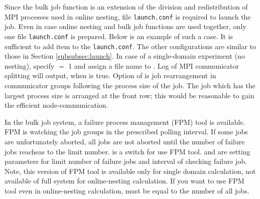 Since the bulk job function is an extension of the division and redistribution of MPI processes used in online nesting, file \verb|launch.conf| is required to launch the job. Even in case online nesting and bulk job functions are used together, only one file \verb|launch.conf| is prepared.
Below is an example of such a case.
It is sufficient to add item  to the \verb|launch.conf|. The other configurations are similar to those in Section \ref{subsubsec:launch}. In case of a single-domain experiment (no nesting), specify  $=$ 1 and assign a file name to .
Log of MPI communicator splitting will output, when  is true. Option of  is job rearrangement
in communicator groups following the process size of the job. The job which has the largest process size is arranged at the front row;
this would be reasonable to gain the efficient node-communication.

In the \scalerm bulk job system, a failure process management (FPM) tool is available. FPM is watching the job groups in the prescribed polling
interval. If some jobs are unfortunately aborted, all jobs are not aborted until the number of failure jobs reacheas to the limit number.
 is a switch for use FPM tool.  and  are setting parameters
for limit number of failure jobs and interval of checking failure job. Note, this version of FPM tool is available only for single domain
calculation, not available of full system for online-nesting calculation. If you want to use FPM tool even in online-nesting calculation,
 must be equal to the number of all jobs.

